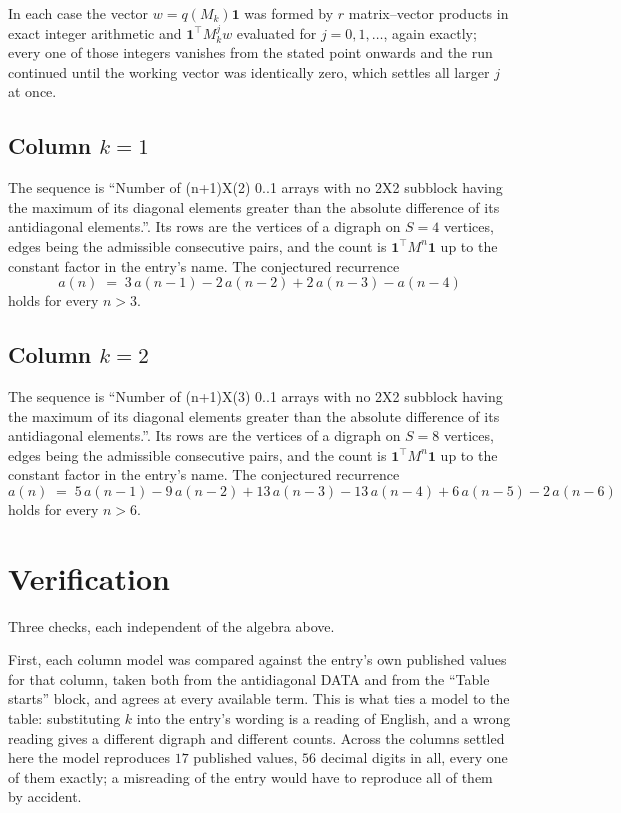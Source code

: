 \documentclass[11pt,a4paper]{article}
\theoremstyle{plain}
\theoremstyle{definition}
\begin{document}
In each case the vector $w=q(M_k)\mathbf{1}$ was formed by $r$ matrix--vector products in
exact integer arithmetic and $\mathbf{1}^{\!\top}M_k^{j}w$ evaluated for $j=0,1,\dots$,
again exactly; every one of those integers vanishes from the stated point onwards and the run
continued until the working vector was identically zero, which settles all larger $j$ at once.

\subsection*{Column $k=1$}
The sequence is ``Number of (n+1)X(2) 0..1 arrays with no 2X2 subblock having the maximum of its diagonal elements greater than the absolute difference of its antidiagonal elements.''. Its rows are the vertices of a digraph on
$S=4$ vertices, edges being the admissible consecutive pairs, and the count is
$\mathbf{1}^{\!\top}M^{n}\mathbf{1}$ up to the constant factor in the entry's name.
The conjectured recurrence
\[
a(n)\;=\;3\,a(n-1) - 2\,a(n-2) + 2\,a(n-3) - a(n-4)
\]
holds for every $n>3$.

\subsection*{Column $k=2$}
The sequence is ``Number of (n+1)X(3) 0..1 arrays with no 2X2 subblock having the maximum of its diagonal elements greater than the absolute difference of its antidiagonal elements.''. Its rows are the vertices of a digraph on
$S=8$ vertices, edges being the admissible consecutive pairs, and the count is
$\mathbf{1}^{\!\top}M^{n}\mathbf{1}$ up to the constant factor in the entry's name.
The conjectured recurrence
\[
a(n)\;=\;5\,a(n-1) - 9\,a(n-2) + 13\,a(n-3) - 13\,a(n-4) + 6\,a(n-5) - 2\,a(n-6)
\]
holds for every $n>6$.

\section{Verification}

Three checks, each independent of the algebra above.

First, each column model was compared against the entry's own published values for that
column, taken both from the antidiagonal DATA and from the ``Table starts'' block, and agrees
at every available term. This is what ties a model to the table: substituting $k$ into the
entry's wording is a reading of English, and a wrong reading gives a different digraph and
different counts. Across the columns settled here the model reproduces $17$ published
values, $56$ decimal digits in all, every one of them exactly; a misreading of the entry
would have to reproduce all of them by accident.
\end{document}
